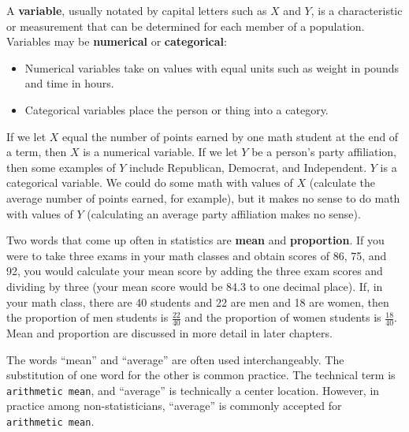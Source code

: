 \documentclass[
  letterpaper,
  DIV=11,
  numbers=noendperiod]{scrreprt}
\providecommand{\tightlist}{%
  \setlength{\itemsep}{0pt}\setlength{\parskip}{0pt}}\usepackage{longtable,booktabs,array}
\begin{document}
A \textbf{variable}, usually notated by capital letters such as \(X\)
and \(Y\), is a characteristic or measurement that can be determined for
each member of a population. Variables may be \textbf{numerical} or
\textbf{categorical}:

\begin{itemize}
\tightlist
\item
  Numerical variables take on values with equal units such as weight in
  pounds and time in hours.
\item
  Categorical variables place the person or thing into a category.
\end{itemize}

If we let \(X\) equal the number of points earned by one math student at
the end of a term, then \(X\) is a numerical variable. If we let \(Y\)
be a person's party affiliation, then some examples of \(Y\) include
Republican, Democrat, and Independent. \(Y\) is a categorical variable.
We could do some math with values of \(X\) (calculate the average number
of points earned, for example), but it makes no sense to do math with
values of \(Y\) (calculating an average party affiliation makes no
sense).

Two words that come up often in statistics are \textbf{mean} and
\textbf{proportion}. If you were to take three exams in your math
classes and obtain scores of 86, 75, and 92, you would calculate your
mean score by adding the three exam scores and dividing by three (your
mean score would be 84.3 to one decimal place). If, in your math class,
there are 40 students and 22 are men and 18 are women, then the
proportion of men students is \(\frac{22}{40}\) and the proportion of
women students is \(\frac{18}{40}\). Mean and proportion are discussed
in more detail in later chapters.

\begin{tcolorbox}[enhanced jigsaw, colframe=quarto-callout-tip-color-frame, bottomtitle=1mm, colbacktitle=quarto-callout-tip-color!10!white, bottomrule=.15mm, toprule=.15mm, breakable, leftrule=.75mm, left=2mm, rightrule=.15mm, colback=white, opacityback=0, opacitybacktitle=0.6, toptitle=1mm, titlerule=0mm, title=\textcolor{quarto-callout-tip-color}{\faLightbulb}\hspace{0.5em}{Average or mean ?}, arc=.35mm, coltitle=black]

The words ``mean'' and ``average'' are often used interchangeably. The
substitution of one word for the other is common practice. The technical
term is \texttt{arithmetic\ mean}, and ``average'' is technically a
center location. However, in practice among non-statisticians,
``average'' is commonly accepted for \texttt{arithmetic\ mean}.

\end{tcolorbox}
\end{document}
